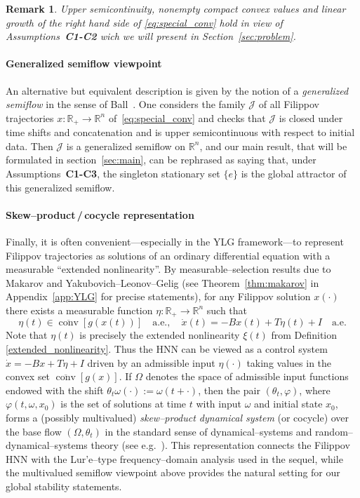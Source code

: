 \documentclass[journal]{IEEEtran}
\theoremstyle{myplain}
\newtheorem{remark}{Remark}
\begin{document}
\begin{remark}
  Upper semicontinuity, nonempty compact convex values and linear growth of the right hand side of \eqref{eq:special_conv}
hold in view of Assumptions~\textbf{C1-C2} wich we will present in Section~\ref{sec:problem}.
\end{remark}

\smallskip
\paragraph*{Generalized semiflow viewpoint}
An alternative but equivalent description is given by the notion of a
\emph{generalized semiflow} in the sense of Ball~\cite{Ball1997}.  One
considers the family $\mathcal{J}$ of all Filippov trajectories
$x:\mathbb{R}_+\to\mathbb{R}^n$ of~\eqref{eq:special_conv} and checks
that $\mathcal{J}$ is closed under time shifts and concatenation and is
upper semicontinuous with respect to initial data.  Then
$\mathcal{J}$ is a generalized semiflow on $\mathbb{R}^n$, and our main
result, that will be formulated in section~\ref{sec:main}, can be rephrased as saying that, under Assumptions~\textbf{C1-C3}, the
singleton stationary set $\{e\}$ is the global attractor of this
generalized semiflow.

\smallskip
\paragraph*{Skew–product\,/\,cocycle representation}
Finally, it is often convenient—especially in the YLG framework—to
represent Filippov trajectories as solutions of an ordinary
differential equation with a measurable ``extended  nonlinearity''.
By measurable–selection results due to Makarov and
Yakubovich–Leonov–Gelig (see Theorem~\ref{thm:makarov} in Appendix~\ref{app:YLG} 
for precise statements), for any Filippov solution $x(\cdot)$ there exists a
measurable function
$\eta:\mathbb{R}_+\to\mathbb{R}^n$ such that
\[
   \eta(t) \in \overline{\operatorname{conv}}[g(x(t))] \quad\text{a.e.},
   \quad
   \dot x(t) = -Bx(t) + T\eta(t) + I \quad\text{a.e.}
\]
Note that $\eta(t)$ is precisely the extended nonlinearity $\xi(t)$ from Definition \ref{extended_nonlinearity}. Thus the HNN can be viewed as a control system
\(
   \dot x = -Bx + T\eta + I
\)
driven by an admissible input $\eta(\cdot)$ taking values in the convex
set $\overline{\operatorname{conv}}[g(x)]$.  If $\Omega$ denotes the
space of admissible input functions endowed with the shift
$\theta_t\omega(\cdot):=\omega(t+\cdot)$, then the pair
$(\theta_t,\varphi)$, where $\varphi(t,\omega,x_0)$ is the set of
solutions at time $t$ with input $\omega$ and initial state $x_0$, forms
a (possibly multivalued) \emph{skew–product dynamical system} (or
cocycle) over the base flow $(\Omega,\theta_t)$ in the standard sense
of dynamical–systems and random–dynamical–systems theory (see e.g.~\cite{Caraballo2001}).
This representation connects the Filippov HNN with the Lur'e–type
frequency–domain analysis used in the sequel, while the multivalued
semiflow viewpoint above provides the natural setting for our global
stability statements.
\end{document}
